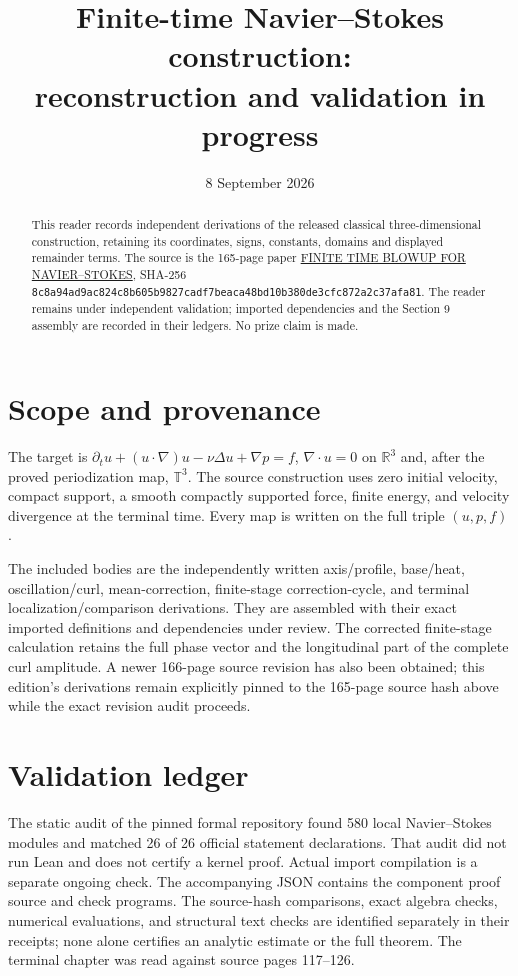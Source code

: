 \documentclass[10pt,a4paper]{article}
\title{Finite-time Navier--Stokes construction:\\reconstruction and validation in progress}
\author{}\date{8 September 2026}
\begin{document}
\maketitle
\begin{abstract}
This reader records independent derivations of the released classical three-dimensional construction, retaining its coordinates, signs, constants, domains and displayed remainder terms. The source is the 165-page paper \href{https://cdn.openai.com/pdf/32d9f210-8b73-45e0-91bc-82a30aef8a9a/navier-stokes.pdf}{FINITE TIME BLOWUP FOR NAVIER--STOKES}, SHA-256 \texttt{8c8a94ad9ac824c8b605b9827cadf7beaca48bd10b380de3cfc872a2c37afa81}. The reader remains under independent validation; imported dependencies and the Section 9 assembly are recorded in their ledgers. No prize claim is made.
\end{abstract}\tableofcontents
\section{Scope and provenance}
The target is $\partial_tu+(u\cdot\nabla)u-\nu\Delta u+\nabla p=f$, $\nabla\cdot u=0$ on $\mathbb R^3$ and, after the proved periodization map, $\mathbb T^3$. The source construction uses zero initial velocity, compact support, a smooth compactly supported force, finite energy, and velocity divergence at the terminal time. Every map is written on the full triple $(u,p,f)$.

The included bodies are the independently written axis/profile, base/heat, oscillation/curl, mean-correction, finite-stage correction-cycle, and terminal localization/comparison derivations. They are assembled with their exact imported definitions and dependencies under review. The corrected finite-stage calculation retains the full phase vector and the longitudinal part of the complete curl amplitude. A newer 166-page source revision has also been obtained; this edition's derivations remain explicitly pinned to the 165-page source hash above while the exact revision audit proceeds.
\section{Validation ledger}
The static audit of the pinned formal repository found 580 local Navier--Stokes modules and matched 26 of 26 official statement declarations. That audit did not run Lean and does not certify a kernel proof. Actual import compilation is a separate ongoing check. The accompanying JSON contains the component proof source and check programs. The source-hash comparisons, exact algebra checks, numerical evaluations, and structural text checks are identified separately in their receipts; none alone certifies an analytic estimate or the full theorem. The terminal chapter was read against source pages 117--126.
\end{document}
